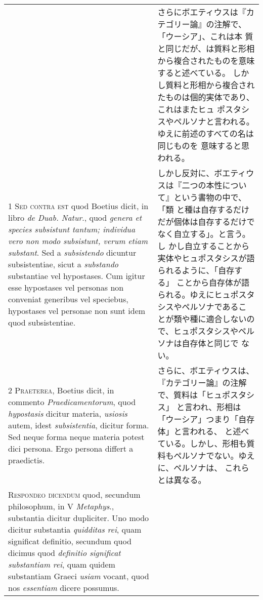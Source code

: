 \documentclass[10pt]{jsarticle} %
\begin{document}
\begin{longtable}{p{21em}p{21em}}
&

さらにボエティウスは『カテゴリー論』の注解で、「ウーシア」、これは本
 質と同じだが、は質料と形相から複合されたものを意味すると述べている。
 しかし質料と形相から複合されたものは個的実体であり、これはまたヒュ
 ポスタシスやペルソナと言われる。ゆえに前述のすべての名は同じものを
 意味すると思われる。


\\



1 {\scshape Sed contra est} quod Boetius dicit, in libro {\itshape de Duab. Natur}., quod {\itshape genera
et species subsistunt tantum; individua vero non modo subsistunt, verum
etiam substant}. Sed a {\itshape subsistendo} dicuntur subsistentiae, sicut a
{\itshape substando} substantiae vel hypostases. Cum igitur esse hypostases vel
personas non conveniat generibus vel speciebus, hypostases vel personae
non sunt idem quod subsistentiae.

&

しかし反対に、ボエティウスは『二つの本性について』という書物の中で、「類
 と種は自存するだけだが個体は自存するだけでなく自立する」。と言う。し
 かし自立することから実体やヒュポスタシスが語られるように、「自存する」
 ことから自存体が語られる。ゆえにヒュポスタシスやペルソナであるこ
 とが類や種に適合しないので、ヒュポスタシスやペルソナは自存体と同じで
 ない。


\\



2 {\scshape Praeterea}, Boetius dicit, in commento {\itshape Praedicamentorum}, quod {\itshape hypostasis}
dicitur materia, {\itshape usiosis} autem, idest {\itshape subsistentia}, dicitur forma. Sed
neque forma neque materia potest dici persona. Ergo persona differt a
praedictis.

&

さらに、ボエティウスは、『カテゴリー論』の注解で、質料は「ヒュポスタシス」
 と言われ、形相は「ウーシア」つまり「自存体」と言われる、
 と述べている。しかし、形相も質料もペルソナでない。ゆえに、ペルソナは、
 これらとは異なる。

\\



{\scshape Respondeo dicendum} quod, secundum philosophum, in V {\itshape Metaphys}.,
substantia dicitur dupliciter. Uno modo dicitur substantia {\itshape quidditas
rei}, quam significat definitio, secundum quod dicimus quod {\itshape definitio
significat substantiam rei}, quam quidem substantiam Graeci {\itshape usiam} vocant,
quod nos {\itshape essentiam} dicere possumus. 



\end{longtable}
\end{document}
